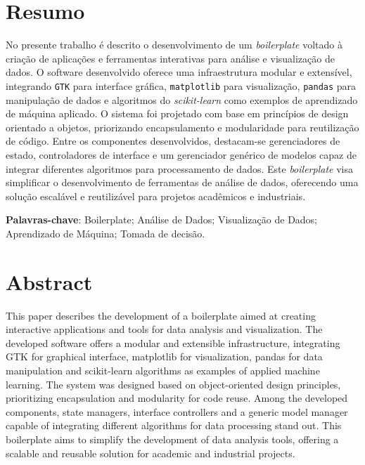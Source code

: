 
\let\cleardoublepage\relax
\chapter*{Resumo}
\thispagestyle{empty}

No presente trabalho é descrito o desenvolvimento de um \textit{boilerplate} voltado à criação de aplicações e ferramentas interativas para análise e visualização de dados. O software desenvolvido oferece uma infraestrutura modular e extensível, integrando \texttt{GTK} para interface gráfica, \texttt{matplotlib} para visualização, \texttt{pandas} para manipulação de dados e algoritmos do \textit{scikit-learn} como exemplos de aprendizado de máquina aplicado. O sistema foi projetado com base em princípios de design orientado a objetos, priorizando encapsulamento e modularidade para reutilização de código. Entre os componentes desenvolvidos, destacam-se gerenciadores de estado, controladores de interface e um gerenciador genérico de modelos capaz de integrar diferentes algoritmos para processamento de dados. Este \textit{boilerplate} visa simplificar o desenvolvimento de ferramentas de análise de dados, oferecendo uma solução escalável e reutilizável para projetos acadêmicos e industriais.

\vspace{1.5ex}

{\bf Palavras-chave}: 
Boilerplate;
Análise de Dados;
Visualização de Dados;
Aprendizado de Máquina;
Tomada de decisão.
\newpage


\chapter*{Abstract}
\thispagestyle{empty}

This paper describes the development of a boilerplate aimed at creating interactive applications and tools for data analysis and visualization. The developed software offers a modular and extensible infrastructure, integrating GTK for graphical interface, matplotlib for visualization, pandas for data manipulation and scikit-learn algorithms as examples of applied machine learning. The system was designed based on object-oriented design principles, prioritizing encapsulation and modularity for code reuse. Among the developed components, state managers, interface controllers and a generic model manager capable of integrating different algorithms for data processing stand out. This boilerplate aims to simplify the development of data analysis tools, offering a scalable and reusable solution for academic and industrial projects.

